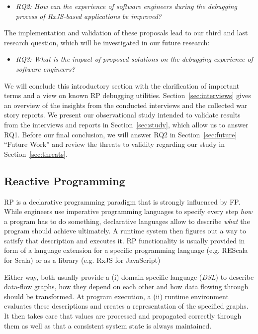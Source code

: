 \documentclass[sigplan,screen,review]{acmart}
\begin{document}
\begin{itemize}
	\item \emph{RQ2: How can the experience of software engineers during the debugging process of RxJS-based applications be improved?}
\end{itemize}

The implementation and validation of these proposals lead to our third and last research question, which will be investigated in our future research:

\begin{itemize}
	\item \emph{RQ3: What is the impact of proposed solutions on the debugging experience of software engineers?}
\end{itemize}

We will conclude this introductory section with the clarification of important terms and a view on known RP debugging utilities. Section~\ref{sec:interviews} gives an overview of the insights from the conducted interviews and the collected war story reports. We present our observational study intended to validate results from the interviews and reports in Section~\ref{sec:study}, which allow us to answer RQ1. Before our final conclusion, we will answer RQ2 in Section~\ref{sec:future} ``Future Work'' and review the threats to validity regarding our study in Section~\ref{sec:threats}.

\subsection{Reactive Programming}

RP is a declarative programming paradigm that is strongly influenced by FP. While engineers use imperative programming languages to specify every step \emph{how} a program has to do something, declarative languages allow to describe \emph{what} the program should achieve ultimately. A runtime system then figures out a way to satisfy that description and executes it. RP functionality is usually provided in form of a language extension for a specific programming language (e.g. REScala for Scala\cite{10.1145/2577080.2577083}) or as a library (e.g. RxJS for JavaScript\cite{rxjs})

Either way, both usually provide a (i) domain specific language (\emph{DSL}) to describe data-flow graphs, how they depend on each other and how data flowing through should be transformed. At program execution, a (ii) runtime environment evaluates these descriptions and creates a representation of the specified graphs. It then takes care that values are processed and propagated correctly through them as well as that a consistent system state\cite{10.1145/2501654.2501666} is always maintained.
\end{document}

